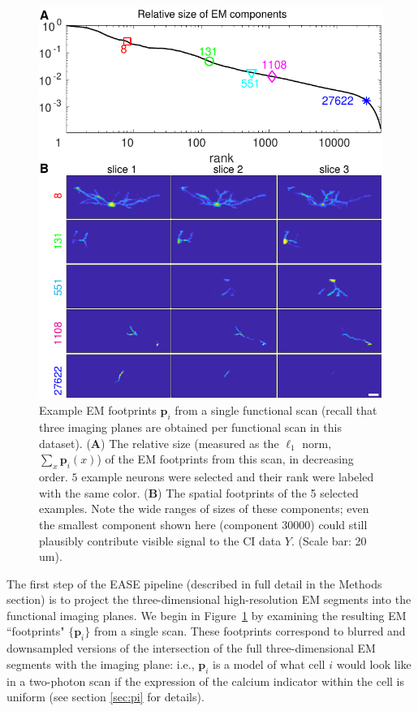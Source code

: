 \documentclass[10pt,letterpaper]{article}
\begin{document}
\begin{figure}[t!]
	\centering
	\includegraphics[width=1\textwidth]{Figs/fig_example_pi.pdf}
	\caption{Example EM footprints $\bm{p}_i$ from a single functional scan (recall that three imaging planes are obtained per functional scan in this dataset).   (\textbf{A}) The relative size (measured as the $\ell_1$ norm, $\sum_x \bm{p}_i(x)$) of the EM footprints from this scan, in decreasing order. $5$ example neurons were selected and their rank were labeled with the same color. (\textbf{B}) The spatial footprints of the 5 selected examples.  Note the wide ranges of sizes of these components; even the smallest component shown here (component 30000) could still plausibly contribute visible signal to the CI data $Y$. (Scale bar: 20 um).}
	\label{fig:em}
\end{figure}

The first step of the EASE pipeline (described in full detail in the Methods section) is to project the three-dimensional high-resolution EM segments into the functional imaging planes.
We begin in Figure~\ref{fig:em} by examining the resulting EM ``footprints" $\{\bm{p}_i\}$ from a single scan.  These footprints correspond to blurred and downsampled versions of the intersection of the full three-dimensional EM segments with the imaging plane: i.e., $\bm{p}_i$ is a model of what cell $i$ would look like in a two-photon scan if the expression of the calcium indicator within the cell is uniform (see section \ref{sec:pi} for details).
\end{document}
